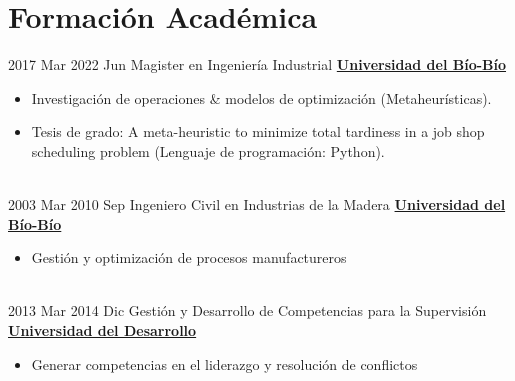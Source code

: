 \documentclass[letterpaper]{DS_class_file} %
\begin{document}
\makeprofile %


\section{Formación Académica}

\begin{twenty} %
   	\twentyitem
	    {2017 Mar}
		{2022 Jun}
	    {\hspace{0.2cm}Magister en Ingeniería Industrial}
	    {\href{https://magister.industrial.ubiobio.cl/}{\hspace{0.27cm} \textbf{Universidad del Bío-Bío} }}
	    {}
	    {\begin{itemize}
			\item Investigación de operaciones \& modelos de optimización (Metaheurísticas).
			\item Tesis de grado: A meta-heuristic to minimize total tardiness in a job shop scheduling problem (Lenguaje de programación: Python).
		\end{itemize}} 
		\\
	   	\twentyitem
			{2003 Mar}
			{2010 Sep}
			{\hspace{0.2cm}Ingeniero Civil en Industrias de la Madera}
			{\href{http://dimad.ubiobio.cl/icim/nweb/public/carreras/ingenieria-civil-en-industrias-de-la-madera}{\hspace{0.27cm} \textbf{Universidad del Bío-Bío} }}
			{}
			{\begin{itemize}
					\item Gestión y optimización de procesos manufactureros
			\end{itemize}} 
			\\
				   	\twentyitem
			{2013 Mar}
			{2014 Dic}
			{\hspace{0.05cm}Gestión y Desarrollo de Competencias para la Supervisión}
			{\href{https://www.udd.cl/extension-y-capacitacion/diplomados/page/2/}{\hspace{0.05cm} \textbf{Universidad del Desarrollo} }}
			{}
			{\begin{itemize}
					\item Generar competencias en el liderazgo y  resolución de conflictos
			\end{itemize}} 
			\\
\end{twenty}
\end{document}
